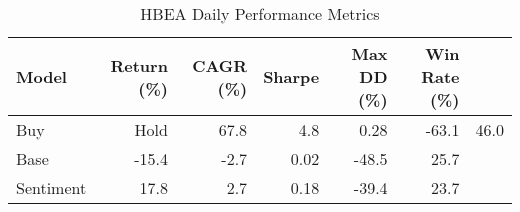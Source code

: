 \begin{table}[h]
\centering
\caption{HBEA Daily Performance Metrics}
\begin{tabular}{lrrrrr}
\hline
Model & Return (\%) & CAGR (\%) & Sharpe & Max DD (\%) & Win Rate (\%) \\
\hline
Buy&Hold & 67.8 & 4.8 & 0.28 & -63.1 & 46.0 \\
Base & -15.4 & -2.7 & 0.02 & -48.5 & 25.7 \\
Sentiment & 17.8 & 2.7 & 0.18 & -39.4 & 23.7 \\
\hline
\end{tabular}
\end{table}